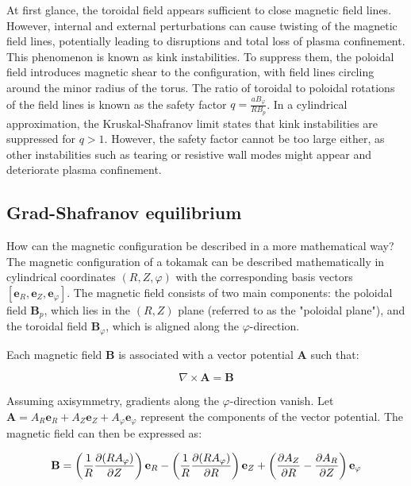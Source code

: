 At first glance, the toroidal field appears sufficient to close magnetic field lines. However, internal and external perturbations can cause twisting of the magnetic field lines, potentially leading to disruptions and total loss of plasma confinement. This phenomenon is known as kink instabilities. To suppress them, the poloidal field introduces magnetic shear to the configuration, with field lines circling around the minor radius of the torus. The ratio of toroidal to poloidal rotations of the field lines is known as the safety factor \( q = \frac{aB_\varphi}{RB_p} \). In a cylindrical approximation, the Kruskal-Shafranov limit \cite{shafranov1956stability, kruskal1958instability} states that kink instabilities are suppressed for \( q > 1 \). However, the safety factor cannot be too large either, as other instabilities such as tearing \cite{furth1973tearing} or resistive wall \cite{fitzpatrick2002simple} modes might appear and deteriorate plasma confinement. \\


\subsection{Grad-Shafranov equilibrium}
\label{sec:intro_GradShafranov}
How can the magnetic configuration be described in a more mathematical way? The magnetic configuration of a tokamak can be described mathematically in cylindrical coordinates \( (R,Z,\varphi) \) with the corresponding basis vectors \([\mathbf{e}_R,\mathbf{e}_Z,\mathbf{e}_\varphi]\). The magnetic field consists of two main components: the poloidal field \(\mathbf{B}_p\), which lies in the \((R,Z)\) plane (referred to as the "poloidal plane"), and the toroidal field \(\mathbf{B}_\varphi\), which is aligned along the \(\varphi\)-direction.

Each magnetic field \(\mathbf{B}\) is associated with a vector potential \(\mathbf{A}\) such that:

\begin{equation}
	\label{eq:intro_magneticVectorPotential}
	\nabla \times \mathbf{A} = \mathbf{B}
\end{equation}

Assuming axisymmetry, gradients along the \(\varphi\)-direction vanish. Let \(\mathbf{A} = A_R \mathbf{e}_R + A_Z \mathbf{e}_Z + A_\varphi \mathbf{e}_\varphi\) represent the components of the vector potential. The magnetic field can then be expressed as:

\begin{equation}
	\mathbf{B} = \left(\frac{1}{R}\pdv{(RA_\varphi)}{Z}\right)\mathbf{e}_R - \left(\frac{1}{R}\pdv{(RA_\varphi)}{R}\right)\mathbf{e}_Z + \left(\pdv{A_Z}{R} - \pdv{A_R}{Z}\right)\mathbf{e}_\varphi
\end{equation}

